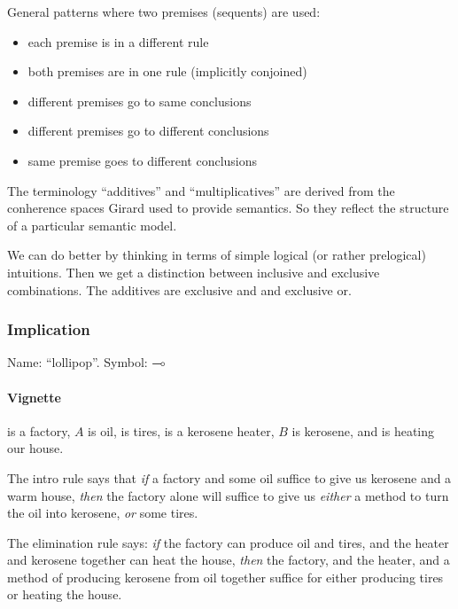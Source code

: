 \documentclass{article}
\begin{document}
General patterns where two premises (sequents) are used:

\begin{itemize}
\item each premise is in a different rule
\item both premises are in one rule (implicitly conjoined)
\item different premises go to same conclusions
\item different premises go to different conclusions
\item same premise goes to different conclusions
\end{itemize}

The terminology ``additives'' and ``multiplicatives'' are derived from
the conherence spaces Girard used to provide semantics. So they
reflect the structure of a particular semantic model.

We can do better by thinking in terms of simple logical (or rather
prelogical) intuitions. Then we get a distinction between inclusive
and exclusive combinations. The additives are exclusive and and
exclusive or.

\subsubsection{Implication}

Name: ``lollipop''.  Symbol: \(\multimap\)

\paragraph{Vignette\\}

\ContextG is a factory, \(A\) is oil, \ContextD is tires, \ContextT is a
kerosene heater, \(B\) is kerosene, and \ContextL is heating our house.

The intro rule says that \textit{if} a factory and some oil suffice to
give us kerosene and a warm house, \textit{then} the factory alone
will suffice to give us \textit{either} a method to turn the oil into
kerosene, \textit{or} some tires.

The elimination rule says: \textit{if} the factory can produce oil and
tires, and the heater and kerosene together can heat the house,
\textit{then} the factory, and the heater, and a method of producing
kerosene from oil together suffice for either producing tires or
heating the house.
\end{document}
